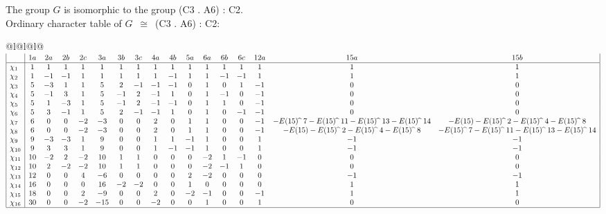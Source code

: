\documentclass[varwidth=\maxdimen,border=10]{standalone}
\begin{document}
The group $G$ is isomorphic to the group  (C3 . A6) : C2.\\
Ordinary character table of $G$\ $\cong$\ (C3 . A6) : C2:\\
\begin{center}
\begin{tabular}{@{}l@{}l@{}l@{}}
\hline
\(\begin{array}{|l|cccccccccccccccc|}
  & 1a & 2a & 2b & 2c & 3a & 3b & 3c & 4a & 4b & 5a & 6a & 6b & 6c & 12a & 15a & 15b\\ \hline
\chi_{1} & 1 & 1 & 1 & 1 & 1 & 1 & 1 & 1 & 1 & 1 & 1 & 1 & 1 & 1 & 1 & 1\\
\chi_{2} & 1 & -1 & -1 & 1 & 1 & 1 & 1 & 1 & -1 & 1 & 1 & -1 & -1 & 1 & 1 & 1\\
\chi_{3} & 5 & -3 & 1 & 1 & 5 & 2 & -1 & -1 & -1 & 0 & 1 & 0 & 1 & -1 & 0 & 0\\
\chi_{4} & 5 & -1 & 3 & 1 & 5 & -1 & 2 & -1 & 1 & 0 & 1 & -1 & 0 & -1 & 0 & 0\\
\chi_{5} & 5 & 1 & -3 & 1 & 5 & -1 & 2 & -1 & -1 & 0 & 1 & 1 & 0 & -1 & 0 & 0\\
\chi_{6} & 5 & 3 & -1 & 1 & 5 & 2 & -1 & -1 & 1 & 0 & 1 & 0 & -1 & -1 & 0 & 0\\
\chi_{7} & 6 & 0 & 0 & -2 & -3 & 0 & 0 & 2 & 0 & 1 & 1 & 0 & 0 & -1 & -E(15) \widehat{\ }\ {7}-E(15) \widehat{\ }\ {11}-E(15) \widehat{\ }\ {13}-E(15) \widehat{\ }\ {14} & -E(15)-E(15) \widehat{\ }\ {2}-E(15) \widehat{\ }\ {4}-E(15) \widehat{\ }\ {8}\\
\chi_{8} & 6 & 0 & 0 & -2 & -3 & 0 & 0 & 2 & 0 & 1 & 1 & 0 & 0 & -1 & -E(15)-E(15) \widehat{\ }\ {2}-E(15) \widehat{\ }\ {4}-E(15) \widehat{\ }\ {8} & -E(15) \widehat{\ }\ {7}-E(15) \widehat{\ }\ {11}-E(15) \widehat{\ }\ {13}-E(15) \widehat{\ }\ {14}\\
\chi_{9} & 9 & -3 & -3 & 1 & 9 & 0 & 0 & 1 & 1 & -1 & 1 & 0 & 0 & 1 & -1 & -1\\
\chi_{10} & 9 & 3 & 3 & 1 & 9 & 0 & 0 & 1 & -1 & -1 & 1 & 0 & 0 & 1 & -1 & -1\\
\chi_{11} & 10 & -2 & 2 & -2 & 10 & 1 & 1 & 0 & 0 & 0 & -2 & 1 & -1 & 0 & 0 & 0\\
\chi_{12} & 10 & 2 & -2 & -2 & 10 & 1 & 1 & 0 & 0 & 0 & -2 & -1 & 1 & 0 & 0 & 0\\
\chi_{13} & 12 & 0 & 0 & 4 & -6 & 0 & 0 & 0 & 0 & 2 & -2 & 0 & 0 & 0 & -1 & -1\\
\chi_{14} & 16 & 0 & 0 & 0 & 16 & -2 & -2 & 0 & 0 & 1 & 0 & 0 & 0 & 0 & 1 & 1\\
\chi_{15} & 18 & 0 & 0 & 2 & -9 & 0 & 0 & 2 & 0 & -2 & -1 & 0 & 0 & -1 & 1 & 1\\
\chi_{16} & 30 & 0 & 0 & -2 & -15 & 0 & 0 & -2 & 0 & 0 & 1 & 0 & 0 & 1 & 0 & 0\\
\hline
\end{array}\)\\
\end{tabular}
\end{center}
\end{document}
